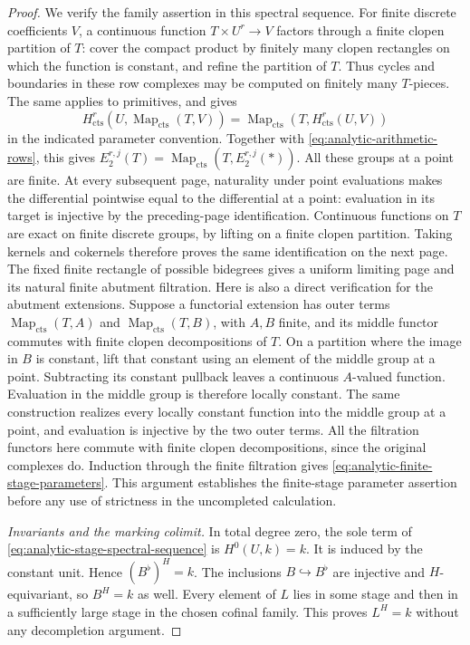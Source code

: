 \begin{proof}
We verify the family assertion in this spectral sequence.
For finite discrete coefficients \(V\), a continuous function
\(T\times U^r\to V\) factors through a finite clopen partition of
\(T\): cover the compact product by finitely many clopen
rectangles on which the function is constant, and refine the
partition of \(T\).
Thus cycles and boundaries in these row complexes may be
computed on finitely many \(T\)-pieces.
The same applies to primitives, and gives
\[
 H^r_{\mathrm{cts}}\!
       \left(U,\operatorname{Map}_{\mathrm{cts}}(T,V)\right)
 =
 \operatorname{Map}_{\mathrm{cts}}
       \left(T,H^r_{\mathrm{cts}}(U,V)\right)
\]
in the indicated parameter convention.
Together with \eqref{eq:analytic-arithmetic-rows}, this gives
\(E_2^{r,j}(T)=\operatorname{Map}_{\mathrm{cts}}
(T,E_2^{r,j}(*))\).
All these groups at a point are finite.  At every subsequent
page, naturality under point evaluations makes the differential
pointwise equal to the differential at a point: evaluation in
its target is injective by the preceding-page identification.
Continuous functions on \(T\) are exact on finite discrete
groups, by lifting on a finite clopen partition.  Taking kernels
and cokernels therefore proves the same identification on the
next page.  The fixed finite rectangle of possible bidegrees
gives a uniform limiting page and its natural finite abutment
filtration.
Here is also a direct verification for the abutment extensions.
Suppose a functorial extension has outer terms
\(\operatorname{Map}_{\mathrm{cts}}(T,A)\) and
\(\operatorname{Map}_{\mathrm{cts}}(T,B)\), with \(A,B\) finite,
and its middle functor commutes with finite clopen decompositions
of \(T\).  On a partition where the image in \(B\) is constant,
lift that constant using an element of the middle group at a
point.  Subtracting its constant pullback leaves a continuous
\(A\)-valued function.  Evaluation in the middle group is
therefore locally constant.  The same construction realizes
every locally constant function into the middle group at a
point, and evaluation is injective by the two outer terms.
All the filtration functors here commute with finite clopen
decompositions, since the original complexes do.
Induction through the finite filtration gives
\eqref{eq:analytic-finite-stage-parameters}.
This argument establishes the finite-stage parameter assertion
before any use of strictness in the uncompleted calculation.

\smallskip\noindent\emph{Invariants and the marking colimit.}
In total degree zero, the sole term of
\eqref{eq:analytic-stage-spectral-sequence} is \(H^0(U,k)=k\).
It is induced by the constant unit.  Hence
\((B^\flat)^H=k\).
The inclusions \(B\hookrightarrow B^\flat\) are injective and
\(H\)-equivariant, so \(B^H=k\) as well.
Every element of \(L\) lies in some stage and then in a
sufficiently large stage in the chosen cofinal family.
This proves \(L^H=k\) without any decompletion argument.


\end{proof}
